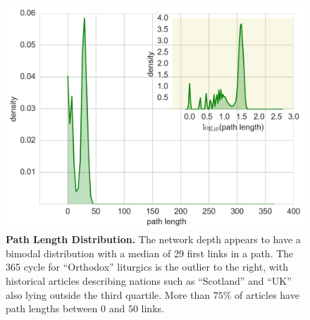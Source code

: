 \documentclass[pre,twocolumn,twoside,superscriptaddress,floatfix, aps, 10pt]{revtex4-1}
\begin{document}
\begin{figure}[tp!]
  \includegraphics[width=\columnwidth]{graphics/path_lengths_dist.png}
  \caption{
    \textbf{Path Length Distribution.}
The network depth appears to have a bimodal distribution with a median of 29 first links in a path.
The 365 cycle for ``Orthodox'' liturgics is the outlier to the right, with historical articles 
describing nations such as ``Scotland'' and ``UK'' also lying outside the third quartile.
More than $75\%$ of articles have path lengths between 
$0$ and $50$ links.}
  \label{fig:Path Length Distribution}
\end{figure}
\end{document}
